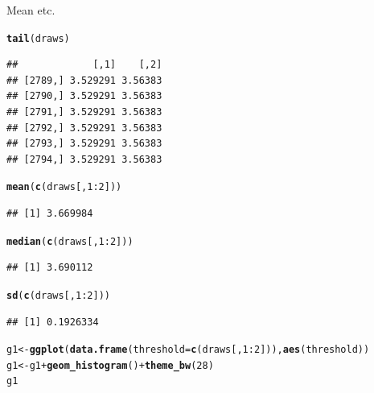 \documentclass{article}\usepackage[]{graphicx}\usepackage[]{color}
\makeatletter
\newcommand{\hlnum}[1]{\textcolor[rgb]{0.686,0.059,0.569}{#1}}%
\newcommand{\hlopt}[1]{\textcolor[rgb]{0,0,0}{#1}}%
\newcommand{\hlstd}[1]{\textcolor[rgb]{0.345,0.345,0.345}{#1}}%
\newcommand{\hlkwb}[1]{\textcolor[rgb]{0.69,0.353,0.396}{#1}}%
\newcommand{\hlkwc}[1]{\textcolor[rgb]{0.333,0.667,0.333}{#1}}%
\newcommand{\hlkwd}[1]{\textcolor[rgb]{0.737,0.353,0.396}{\textbf{#1}}}%
\newenvironment{kframe}{%
 \def\at@end@of@kframe{}%
 \ifinner\ifhmode%
  \def\at@end@of@kframe{\end{minipage}}%
  \begin{minipage}{\columnwidth}%
 \fi\fi%
 \def\FrameCommand##1{\hskip\@totalleftmargin \hskip-\fboxsep
 \colorbox{shadecolor}{##1}\hskip-\fboxsep
     \hskip-\linewidth \hskip-\@totalleftmargin \hskip\columnwidth}%
 \MakeFramed {\advance\hsize-\width
   \@totalleftmargin\z@ \linewidth\hsize
   \@setminipage}}%
 {\par\unskip\endMakeFramed%
 \at@end@of@kframe}
\newenvironment{knitrout}{}{} %
\makeatother
\begin{document}
Mean etc.

\begin{knitrout}
\color{fgcolor}\begin{kframe}
\begin{alltt}
\hlkwd{tail}\hlstd{(draws)}
\end{alltt}
\begin{verbatim}
##             [,1]    [,2]
## [2789,] 3.529291 3.56383
## [2790,] 3.529291 3.56383
## [2791,] 3.529291 3.56383
## [2792,] 3.529291 3.56383
## [2793,] 3.529291 3.56383
## [2794,] 3.529291 3.56383
\end{verbatim}
\begin{alltt}
\hlkwd{mean}\hlstd{(}\hlkwd{c}\hlstd{(draws[,} \hlnum{1}\hlopt{:}\hlnum{2}\hlstd{]))}
\end{alltt}
\begin{verbatim}
## [1] 3.669984
\end{verbatim}
\begin{alltt}
\hlkwd{median}\hlstd{(}\hlkwd{c}\hlstd{(draws[,} \hlnum{1}\hlopt{:}\hlnum{2}\hlstd{]))}
\end{alltt}
\begin{verbatim}
## [1] 3.690112
\end{verbatim}
\begin{alltt}
\hlkwd{sd}\hlstd{(}\hlkwd{c}\hlstd{(draws[,} \hlnum{1}\hlopt{:}\hlnum{2}\hlstd{]))}
\end{alltt}
\begin{verbatim}
## [1] 0.1926334
\end{verbatim}
\begin{alltt}
\hlstd{g1} \hlkwb{<-} \hlkwd{ggplot}\hlstd{(}\hlkwd{data.frame}\hlstd{(}\hlkwc{threshold} \hlstd{=} \hlkwd{c}\hlstd{(draws[,} \hlnum{1}\hlopt{:}\hlnum{2}\hlstd{])),} \hlkwd{aes}\hlstd{(threshold))}
\hlstd{g1} \hlkwb{<-} \hlstd{g1} \hlopt{+} \hlkwd{geom_histogram}\hlstd{()} \hlopt{+} \hlkwd{theme_bw}\hlstd{(}\hlnum{28}\hlstd{)}
\hlstd{g1}
\end{alltt}



\end{kframe}
\end{knitrout}
\end{document}
